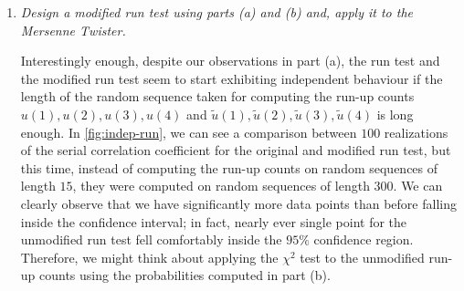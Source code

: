 \documentclass{article}
\begin{document}
\begin{enumerate}
\begin{enumerate}
\begin{proof}
                    Now, the observing a run-up of length exactly $n$ means observing a run-up of length at least $n$ but {\it not} a run-up of length $n+1$ or greater.
                    Since the probability of a run-up of length at least $n$ is $\sfrac{1}{n!}$ and the probability of a run-up of length at least $n+1$ is $\sfrac{1}{(n+1)!}$,
                    we can conclude that the probability of observing a run-up of length $n$ exactly is $\sfrac{1}{n!} - \sfrac{1}{(n+1)!}$.

                \end{proof}
            \item
                {\it Design a modified run test using parts (a) and (b) and, apply it to the Mersenne Twister.}

                Interestingly enough, despite our observations in part (a), the run test and the modified run test seem to start exhibiting independent behaviour
                if the length of the random sequence taken for computing the run-up counts $u(1), u(2), u(3), u(4)$ and $\tilde{u}(1), \tilde{u}(2), \tilde{u}(3), \tilde{u}(4)$
                is long enough. In \autoref{fig:indep-run},
                we can see a comparison between $100$ realizations of the serial correlation coefficient for the original and modified run test,
                but this time, instead of computing the run-up counts on random sequences of length $15$, they were computed on random sequences of length $300$.
                We can clearly observe that we have significantly more data points than before falling inside the confidence interval;
                in fact, nearly ever single point for the unmodified run test fell comfortably inside the $95\%$ confidence region.
                Therefore, we might think about applying the $\chi^2$ test to the unmodified run-up counts using the probabilities computed in part (b).


\end{enumerate}
\end{enumerate}
\end{document}
